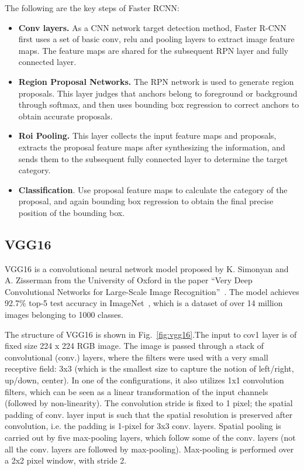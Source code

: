 The following are the key steps of Faster RCNN:
\begin{itemize}
	\item \textbf{Conv layers.} As a CNN network target detection method, Faster R-CNN first uses a set of basic conv, relu and pooling layers to extract image feature maps. The feature maps are shared for the subsequent RPN layer and fully connected layer.
	\item \textbf{Region Proposal Networks.} The RPN network is used to generate region proposals. This layer judges that anchors belong to foreground or background through softmax, and then uses bounding box regression to correct anchors to obtain accurate proposals.
	\item \textbf{Roi Pooling. }This layer collects the input feature maps and proposals, extracts the proposal feature maps after synthesizing the information, and sends them to the subsequent fully connected layer to determine the target category.
	\item \textbf{Classification}. Use proposal feature maps to calculate the category of the proposal, and again bounding box regression to obtain the final precise position of the bounding box.
\end{itemize}

\subsection{VGG16}

VGG16 is a convolutional neural network model proposed by K. Simonyan and A. Zisserman from the University of Oxford in the paper ``Very Deep Convolutional Networks for Large-Scale Image Recognition''~\cite{simonyan2015deep}. The model achieves 92.7\% top-5 test accuracy in ImageNet~\cite{ILSVRC15}, which is a dataset of over 14 million images belonging to 1000 classes.

The structure of VGG16 is shown in Fig.~\ref{fig:vgg16}.The input to cov1 layer is of fixed size 224 x 224 RGB image. The image is passed through a stack of convolutional (conv.) layers, where the filters were used with a very small receptive field: 3x3 (which is the smallest size to capture the notion of left/right, up/down, center). In one of the configurations, it also utilizes 1x1 convolution filters, which can be seen as a linear transformation of the input channels (followed by non-linearity). The convolution stride is fixed to 1 pixel; the spatial padding of conv. layer input is such that the spatial resolution is preserved after convolution, i.e. the padding is 1-pixel for 3x3 conv. layers. Spatial pooling is carried out by five max-pooling layers, which follow some of the conv.  layers (not all the conv. layers are followed by max-pooling). Max-pooling is performed over a 2x2 pixel window, with stride 2.


